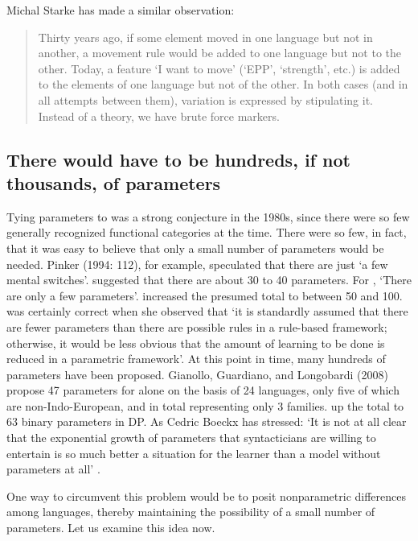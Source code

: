 \documentclass[output=paper,
modfonts
]{LSP/langsci}
\begin{document}
Michal Starke has made a similar observation:

\begin{quote}
Thirty years ago, if some element moved in one language but not in
another, a movement rule would be added to one language but not to the
other. Today, a feature `I want to move' (`EPP', `strength', etc.) is
added to the elements of one language but not of the other. In both
cases (and in all attempts between them), variation is expressed by
stipulating it. Instead of a theory, we have brute force markers.
\citep[140]{starke2014}
\end{quote}

\subsection{There would have to be hundreds, if not thousands, of parameters}

Tying parameters to  was a strong conjecture in the
1980s, since there were so few generally recognized functional
categories at the time. There were so few, in fact, that it was easy to
believe that only a small number of parameters would be needed. Pinker
(1994: 112), for example, speculated that there are just `a few mental
switches'. \citet[259]{lightfoot1999} suggested that there are about 30 to 40
parameters. For \citet[16]{adger2003n}, `There are only a few parameters'.
\citet{roberts2005} increased the presumed total to between 50
and 100. \citet[734]{fodor2001} was certainly correct when she observed that
`it is standardly assumed that there are fewer parameters than there are
possible rules in a rule-based framework; otherwise, it would be less
obvious that the amount of learning to be done is reduced in a
parametric framework'. At this point in time, many hundreds of
parameters have been proposed. Gianollo, Guardiano, and Longobardi
(2008) propose 47 parameters for  alone on the basis of 24 languages,
only five of which are non-Indo-European, and in total representing only
3 families. \citet{longobardi2011} up the total to 63 binary
parameters in DP. As Cedric Boeckx has stressed: `It is not at all clear
that the exponential growth of parameters that syntacticians are willing
to entertain is so much better a situation for the learner than a model
without parameters at all' \citep[157]{boeckx2014}.

One way to circumvent this problem would be to posit nonparametric
differences among languages, thereby maintaining the possibility of a
small number of parameters. Let us examine this idea now.
\end{document}

